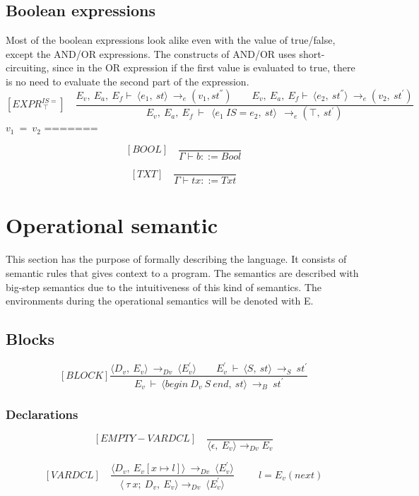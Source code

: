 \subsection{Boolean expressions}
Most of the boolean expressions look alike even with the value of true/false, except the AND/OR expressions. The constructs of AND/OR uses short-circuiting, since in the OR expression if the first value is evaluated to true, there is no need to evaluate the second part of the expression.
	\[
	[EXPR^{IS=}_{\ \top}] \quad	
	\dfrac{E_v, \ E_a, \ E_f \vdash \ \langle e_1, \ st \rangle \ \rightarrow_e (v_1, st^{''}) \qquad E_v, \ E_a, \ E_f \vdash \ \langle e_2, \ st^{''} \rangle \ \rightarrow_e (v_2, \ st^{'})}{E_v, \ E_a, \ E_f \ \vdash \ \ \langle e_1 \ IS= e_2, \ st \rangle \ \ \rightarrow_e (\top, \ st^{'})}	
	\]
	\begin{math}		
		v_1 \ = \ v_2 		
	\end{math}	
=======
	 
	\[
	[BOOL] \quad
	\dfrac{}{\Gamma \vdash b ::= Bool}
	\]
	
  	\[
  	[TXT] \quad
  	\dfrac{}{\Gamma \vdash tx ::= Txt}
  	\]
  	
  \section{Operational semantic}
  This section has the purpose of formally describing the language. It consists of semantic rules that gives context to a program. 
  The semantics are described with big-step semantics due to the intuitiveness of this kind of semantics. 
  The environments during the operational semantics will be denoted with E.
  
  \subsection{Blocks}
    \[
	  [BLOCK]
	  \dfrac{\langle D_v, \ E_v \rangle \ \rightarrow_{Dv} \ \langle E_v^{'} \rangle \qquad E_v^{'} \ \vdash \ \langle S, \ st \rangle \ \rightarrow_S \ st^{'}}{E_v \ \vdash \ \langle begin \ D_v \ S \ end, \ st \rangle \ \rightarrow_B \ st^{'}}
	  \]
  
  \subsubsection{Declarations}
  	\[
	[EMPTY-VARDCL] \quad
	\dfrac{}{\langle\epsilon, \ E_v\rangle \rightarrow_{Dv} E_v}
	\]
    	
   	\[
   	[VARDCL] \quad
   	\dfrac{ \langle D_v, \ E_v[x \mapsto l]\rangle \ \rightarrow_{Dv} \ \langle E_v^{'} \rangle }{ \langle \ \tau \ x; \ D_v,\ E_v \rangle \rightarrow_{Dv} \ \langle E_v^{'} \rangle }
   	\qquad \ \ l = E_v(next)
   	\]
    	
